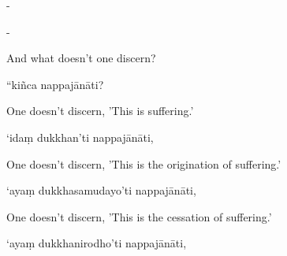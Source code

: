 \begin{samepage}
\begin{leftcolumn*}
-
\end{leftcolumn*}

\begin{rightcolumn}
-
\end{rightcolumn}
\end{samepage}

\begin{samepage}
\begin{leftcolumn*}
And what doesn't one discern?
\end{leftcolumn*}

\begin{rightcolumn}
“kiñca nappajānāti?
\end{rightcolumn}
\end{samepage}

\begin{samepage}
\begin{leftcolumn*}
One doesn't discern, 'This is suffering.'
\end{leftcolumn*}

\begin{rightcolumn}
‘idaṃ dukkhan’ti nappajānāti,
\end{rightcolumn}
\end{samepage}

\begin{samepage}
\begin{leftcolumn*}
One doesn't discern, 'This is the origination of suffering.'
\end{leftcolumn*}

\begin{rightcolumn}
‘ayaṃ dukkhasamudayo’ti nappajānāti,
\end{rightcolumn}
\end{samepage}

\begin{samepage}
\begin{leftcolumn*}
One doesn't discern, 'This is the cessation of suffering.'
\end{leftcolumn*}

\begin{rightcolumn}
‘ayaṃ dukkhanirodho’ti nappajānāti,
\end{rightcolumn}
\end{samepage}

